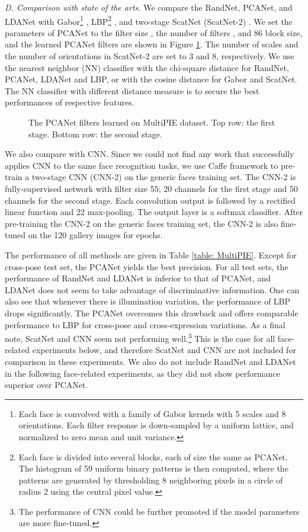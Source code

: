 \documentclass[10pt,journal,compsoc]{IEEEtran}
\begin{document}
\vspace{0.3\baselineskip}
{\em D. Comparison with state of the arts.} We compare the RandNet, PCANet, and LDANet with Gabor\footnote{Each face is convolved with a family of Gabor kernels with 5 scales and 8 orientations. Each filter response is down-sampled by a  uniform lattice, and normalized to zero mean and unit variance.} \cite{Liu2002}, LBP\footnote{Each face is divided into several blocks, each of size the same as PCANet. The histogram of 59 uniform binary patterns is then computed, where the patterns are generated by thresholding 8 neighboring pixels in a circle of radius 2 using the central pixel value.} \cite{Ahonen2006}, and two-stage ScatNet (ScatNet-2) \cite{Bruna2013}. We set the parameters of PCANet to the filter size , the number of filters , and 86 block size, and the learned PCANet filters are shown in Figure \ref{fig: MultiPIE_filters}. The number of scales and the number of orientations in ScatNet-2 are set to 3 and 8, respectively. We use the nearest neighbor (NN) classifier with the chi-square distance for RandNet, PCANet, LDANet and LBP, or with the cosine distance for Gabor and ScatNet. The NN classifier with different distance measure is to secure the best performances of respective features.


\begin{figure}[t]
\centering
{}
\caption{The PCANet filters learned on MultiPIE dataset. Top row: the first stage. Bottom row: the second stage.} \label{fig: MultiPIE_filters}
\end{figure}


We also compare with CNN. Since we could not find any work that successfully applies CNN to the same face recognition tasks, we use Caffe framework \cite{Jia13caffe} to pre-train a two-stage CNN (CNN-2) on the generic faces training set. The CNN-2 is fully-supervised network with filter size 55; 20 channels for the first stage and 50 channels for the second stage. Each convolution output is followed by a rectified linear function  and 22 max-pooling. The output layer is a softmax classifier. After pre-training the CNN-2 on the generic faces training set, the CNN-2 is also fine-tuned on the 120 gallery images for  epochs.

The performance of all methods are given in Table \ref{table: MultiPIE}. Except for cross-pose test set, the PCANet yields the best precision. For all test sets, the performance of RandNet and LDANet is inferior to that of PCANet, and LDANet does not seem to take advantage of discriminative information. One can also see that whenever there is illumination variation, the performance of LBP drops significantly. The PCANet overcomes this drawback and offers comparable performance to LBP for cross-pose and cross-expression variations. As a final note, ScatNet and CNN seem not performing well.\footnote{The performance of CNN could be further promoted if the model parameters are more fine-tuned.} This is the case for all face-related experiments below, and therefore ScatNet and CNN are not included for comparison in these experiments. We also do not include RandNet and LDANet in the following face-related experiments, as they did not show performance superior over PCANet.
\end{document}
